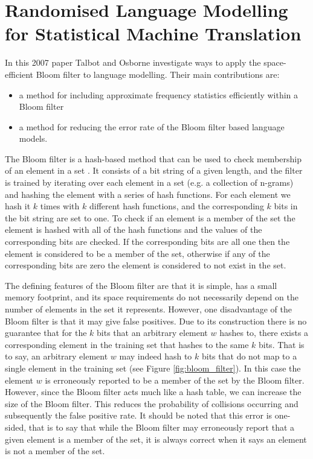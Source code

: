 \documentclass[sigconf, nonacm=true]{acmart}
\begin{document}
\section{Randomised Language Modelling for Statistical Machine Translation} 
In this 2007 paper Talbot and Osborne \cite{talbot2007randomised} investigate ways to apply the space-efficient Bloom filter to language modelling.
Their main contributions are:
\begin{itemize}
    \item a method for including approximate frequency statistics efficiently within a Bloom filter
    \item a method for reducing the error rate of the Bloom filter based language models.
\end{itemize}

The Bloom filter is a hash-based method that can be used to check membership of an element in a set \cite{bloom1970space}. 
It consists of a bit string of a given length, and the filter is trained by iterating over each element in a set (e.g. a collection of n-grams) and hashing the element with a series of hash functions. For each element we hash it $k$ times with $k$ different hash functions, and the corresponding $k$ bits in the bit string are set to one. To check if an element is a member of the set the element is hashed with all of the hash functions and the values of the corresponding bits are checked. If the corresponding bits are all one then the element is considered to be a member of the set, otherwise if any of the corresponding bits are zero the element is considered to not exist in the set.

The defining features of the Bloom filter are that it is simple, has a small memory footprint, and its space requirements do not necessarily depend on the number of elements in the set it represents. However, one disadvantage of the Bloom filter is that it may give false positives. Due to its construction there is no guarantee that for the $k$ bits that an arbitrary element $w$ hashes to, there exists a corresponding element in the training set that hashes to the same $k$ bits. That is to say, an arbitrary element $w$ may indeed hash to $k$ bits that do not map to a single element in the training set (see Figure \ref{fig:bloom_filter}). In this case the element $w$ is erroneously reported to be a member of the set by the Bloom filter. However, since the Bloom filter acts much like a hash table, we can increase the size of the Bloom filter. This reduces the probability of collisions occurring and subsequently the false positive rate.
%
It should be noted that this error is one-sided, that is to say that while the Bloom filter may erroneously report that a given element is a member of the set, it is always correct when it says an element is not a member of the set.
\end{document}
